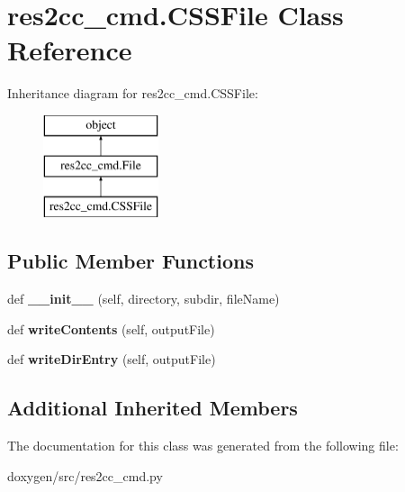 \hypertarget{classres2cc__cmd_1_1_c_s_s_file}{}\section{res2cc\+\_\+cmd.\+C\+S\+S\+File Class Reference}
\label{classres2cc__cmd_1_1_c_s_s_file}
Inheritance diagram for res2cc\+\_\+cmd.\+C\+S\+S\+File\+:\begin{figure}[H]
\begin{center}
\leavevmode
\includegraphics[height=3.000000cm]{classres2cc__cmd_1_1_c_s_s_file}
\end{center}
\end{figure}
\subsection*{Public Member Functions}
\begin{DoxyCompactItemize}
\item 
\mbox{\label{classres2cc__cmd_1_1_c_s_s_file_a366397bca9c60b560eea0154f68f844b}} 
def {\bfseries \+\_\+\+\_\+init\+\_\+\+\_\+} (self, directory, subdir, file\+Name)
\item 
\mbox{\label{classres2cc__cmd_1_1_c_s_s_file_aaa1cd3cf96590f83a01eae27e9529a33}} 
def {\bfseries write\+Contents} (self, output\+File)
\item 
\mbox{\label{classres2cc__cmd_1_1_c_s_s_file_a12875ea25e1eec1b289ec321fdbc78cb}} 
def {\bfseries write\+Dir\+Entry} (self, output\+File)
\end{DoxyCompactItemize}
\subsection*{Additional Inherited Members}


The documentation for this class was generated from the following file\+:\begin{DoxyCompactItemize}
\item 
doxygen/src/res2cc\+\_\+cmd.\+py\end{DoxyCompactItemize}
